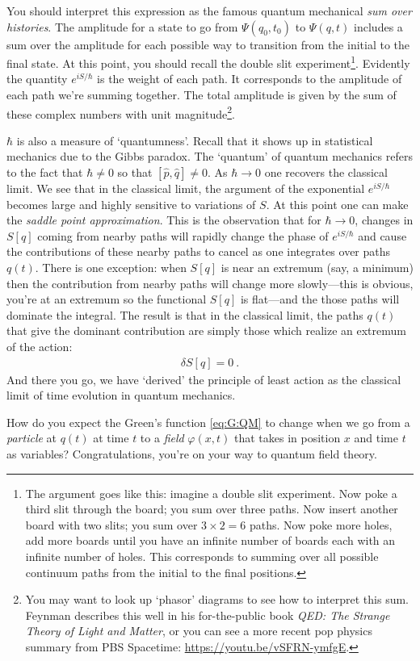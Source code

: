 You should interpret this expression as the famous quantum mechanical \emph{sum over histories}. The amplitude for a state to go from $\Psi(q_0,t_0)$ to $\Psi(q,t)$ includes a sum over the amplitude for each possible way to transition from the initial to the final state. At this point, you should recall the double slit experiment\footnote{The argument goes like this: imagine a double slit experiment. Now poke a third slit through the board; you sum over three paths. Now insert another board with two slits; you sum over $3\times 2 = 6$ paths. Now poke more holes, add more boards until you have an infinite number of boards each with an infinite number of holes. This corresponds to summing over all possible continuum paths from the initial to the final positions.}.
%
Evidently the quantity $e^{iS/\hbar}$ is the weight of each path. It corresponds to the amplitude of each path we're summing together. The total amplitude is given by the sum of these complex numbers with unit magnitude\footnote{You may want to look up `phasor' diagrams to see how to interpret this sum. Feynman describes this well in his for-the-public book \emph{QED: The Strange Theory of Light and Matter}, or you can see a more recent pop physics summary from PBS Spacetime: \url{https://youtu.be/vSFRN-ymfgE}.}.

$\hbar$ is also a measure of `quantumness'. Recall that it shows up in statistical mechanics due to the Gibbs paradox. The `quantum' of quantum mechanics refers to the fact that $\hbar\neq 0$ so that $[\hat p, \hat q] \neq 0$. As $\hbar\to 0$ one recovers the classical limit. We see that in the classical limit, the argument of the exponential $e^{iS/\hbar}$ becomes large and highly sensitive to variations of $S$. At this point one can make the \emph{saddle point approximation}. This is the observation that for $\hbar\to 0$, changes in $S[q]$ coming from nearby paths will rapidly change the phase of $e^{iS/\hbar}$ and cause the contributions of these nearby paths to cancel as one integrates over paths $q(t)$. There is one exception: when $S[q]$ is near an extremum (say, a minimum) then the contribution from nearby paths will change more slowly---this is obvious, you're at an extremum so the functional $S[q]$ is flat---and the those paths will dominate the integral. The result is that in the classical limit, the paths $q(t)$ that give the dominant contribution are simply those which realize an extremum of the action:
\begin{align}
	\delta S[q] = 0 \ .
\end{align}
And there you go, we have `derived' the principle of least action as the classical limit of time evolution in quantum mechanics. 

\begin{exercise}
How do you expect the Green's function \eqref{eq:G:QM} to change when we go from a \emph{particle} at $q(t)$ at time $t$ to a \emph{field} $\varphi(x,t)$ that takes in position $x$ and time $t$ as variables?  Congratulations, you're on your way to quantum field theory. 
\end{exercise}